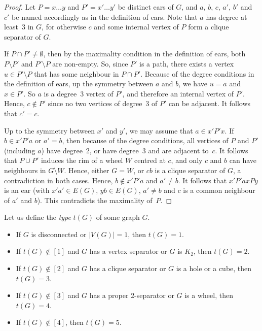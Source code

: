 \documentclass[11pt]{article}
\newcommand{\sm}{\setminus}
\begin{document}
\begin{proof}
  Let $P = x\dots y$  and $P' = x'\dots y'$ be distinct ears of $G$, and $a$, $b$, $c$, $a'$, $b'$ and $c'$ be named accordingly as in the definition of ears. Note that $a$ has degree at least~3 in $G$, for otherwise $c$ and some internal vertex of $P$ form a clique separator of $G$.
  
  If $P\cap P'\neq \emptyset$, then by the maximality condition in the definition of ears, both $P\sm P'$ and $P'\sm P$ are non-empty. So, since $P'$ is a path, there exists a vertex $u\in P'\sm P$ that has some neighbour in $P\cap P'$.  Because of the degree conditions in the definition of ears, up the symmetry between $a$ and $b$, we have $u=a$ and $x\in P'$. So $a$ is a degree~3 vertex of $P'$, and therefore an internal vertex of $P'$.  Hence, $c\notin P'$ since no two vertices of degree~3 of $P'$ can be adjacent. It follows that $c'=c$.  
  
  Up to the symmetry between $x'$ and $y'$, we may assume that $a \in x' P' x$. If $b\in x' P' a$ or $a'=b$, then because of the degree conditions, all vertices of $P$ and $P'$ (including $a$) have degree~2, or have degree~3 and are adjacent to~$c$.  
  It follows that $P\cup P'$ induces the rim of a wheel $W$ centred at $c$, and only $c$ and $b$ can have neighbours in  $G\sm W$.  
  Hence, either $G=W$, or $cb$ is a clique separator of $G$, a contradiction in both cases.  
  Hence, $b\notin x' P' a$ and $a'\neq b$.  
  It follows that $x'P'a xPy$ is an ear (with $x'a'\in E(G)$, $yb\in E(G)$, $a'\neq b$ and $c$ is a common neighbour of $a'$ and $b$).  
  This contradicts the maximality of~$P$.
\end{proof}


 Let us define the \emph{type} $t(G)$ of some graph $G$.

\begin{itemize}
    \item If $G$ is disconnected or $|V(G)| = 1$, then $t(G)=1$.    
    \item If $t(G)\notin [1]$ and $G$ has a vertex separator or $G$ is $K_2$, then $t(G) = 2$.
    \item If $t(G)\notin [2]$ and $G$ has a clique separator or $G$ is a hole or a cube, then $t(G) = 3$.
    \item If $t(G)\notin [3]$ and $G$ has a proper 2-separator or $G$ is a wheel, then $t(G) = 4$. 
    \item If $t(G)\notin [4]$, then $t(G) = 5$.
\end{itemize}
\end{document}
